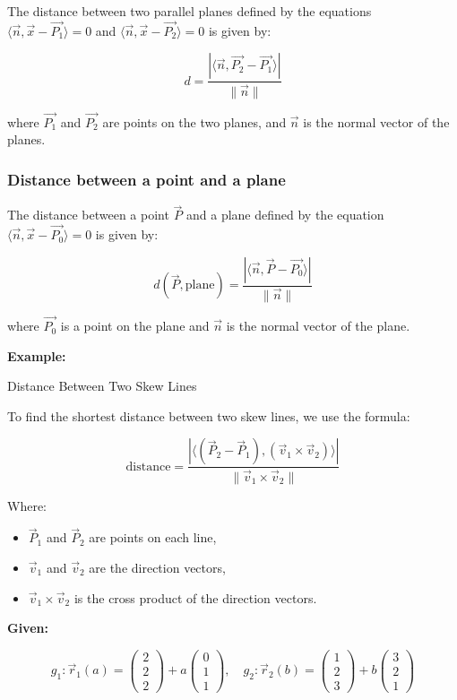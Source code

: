 The distance between two parallel planes defined by the equations \(\langle \vec{n}, \vec{x} - \vec{P_1} \rangle = 0\) and \(\langle \vec{n}, \vec{x} - \vec{P_2} \rangle = 0\) is given by:

\[
	d = \frac{|\langle \vec{n}, \vec{P_2} - \vec{P_1} \rangle|}{\|\vec{n}\|}
\]

where \(\vec{P_1}\) and \(\vec{P_2}\) are points on the two planes, and \(\vec{n}\) is the normal vector of the planes.

\subsubsection{Distance between a point and a plane}

The distance between a point \(\vec{P}\) and a plane defined by the equation \(\langle \vec{n}, \vec{x} - \vec{P_0} \rangle = 0\) is given by:

\[
	d(\vec{P}, \text{plane}) = \frac{|\langle \vec{n}, \vec{P} - \vec{P_0} \rangle|}{\|\vec{n}\|}
\]

where \(\vec{P_0}\) is a point on the plane and \(\vec{n}\) is the normal vector of the plane.
\vspace{\baselineskip}

\textbf{Example:}
\vspace{\baselineskip}
 
Distance Between Two Skew Lines

To find the shortest distance between two skew lines, we use the formula:

\[
	\text{distance} = \frac{|\langle(\vec{P}_2 - \vec{P}_1), (\vec{v}_1 \times \vec{v}_2)\rangle|}{\|\vec{v}_1 \times \vec{v}_2\|}
\]

Where:

\begin{itemize}
	\item \(\vec{P}_1\) and \(\vec{P}_2\) are points on each line,
	\item \(\vec{v}_1\) and \(\vec{v}_2\) are the direction vectors,
	\item \(\vec{v}_1 \times \vec{v}_2\) is the cross product of the direction vectors.
\end{itemize}

\textbf{Given:}

\[
	g_1: \vec{r}_1(a) = \begin{pmatrix} 2 \\ 2 \\ 2 \end{pmatrix} + a \begin{pmatrix} 0 \\ 1 \\ 1 \end{pmatrix}, \quad
	g_2: \vec{r}_2(b) = \begin{pmatrix} 1 \\ 2 \\ 3 \end{pmatrix} + b \begin{pmatrix} 3 \\ 2 \\ 1 \end{pmatrix}
\]

